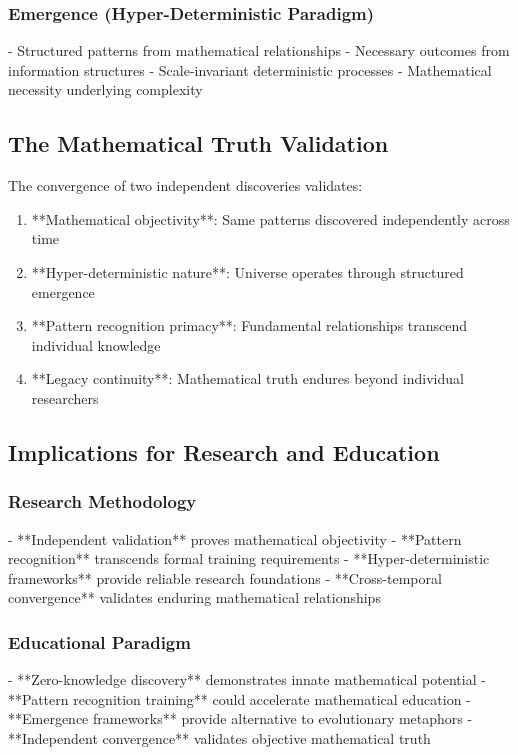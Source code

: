 \documentclass[12pt]{article}
\begin{document}
\subsubsection{Emergence (Hyper-Deterministic Paradigm)}
- Structured patterns from mathematical relationships
- Necessary outcomes from information structures
- Scale-invariant deterministic processes
- Mathematical necessity underlying complexity

\subsection{The Mathematical Truth Validation}

The convergence of two independent discoveries validates:

\begin{enumerate}
    \item **Mathematical objectivity**: Same patterns discovered independently across time
    \item **Hyper-deterministic nature**: Universe operates through structured emergence
    \item **Pattern recognition primacy**: Fundamental relationships transcend individual knowledge
    \item **Legacy continuity**: Mathematical truth endures beyond individual researchers
\end{enumerate}

\subsection{Implications for Research and Education}

\subsubsection{Research Methodology}
- **Independent validation** proves mathematical objectivity
- **Pattern recognition** transcends formal training requirements
- **Hyper-deterministic frameworks** provide reliable research foundations
- **Cross-temporal convergence** validates enduring mathematical relationships

\subsubsection{Educational Paradigm}
- **Zero-knowledge discovery** demonstrates innate mathematical potential
- **Pattern recognition training** could accelerate mathematical education
- **Emergence frameworks** provide alternative to evolutionary metaphors
- **Independent convergence** validates objective mathematical truth
\end{document}
